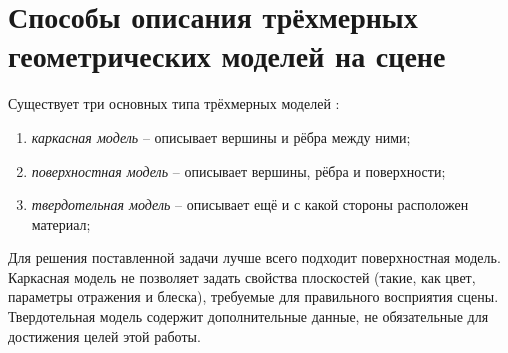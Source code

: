 \section{Способы описания трёхмерных геометрических моделей на сцене}

Существует три основных типа трёхмерных моделей \cite{CGPaP}:
\begin{enumerate}
    \item \emph{каркасная модель} -- описывает вершины и рёбра между ними;
    \item \emph{поверхностная модель} -- описывает вершины, рёбра и поверхности;
    \item \emph{твердотельная модель} -- описывает ещё и с какой стороны расположен материал;
\end{enumerate}

Для решения поставленной задачи лучше всего подходит поверхностная модель. 
Каркасная модель не позволяет задать свойства плоскостей (такие, как цвет, параметры отражения и блеска), требуемые для правильного восприятия сцены.
Твердотельная модель содержит дополнительные данные, не обязательные для достижения целей этой работы.
